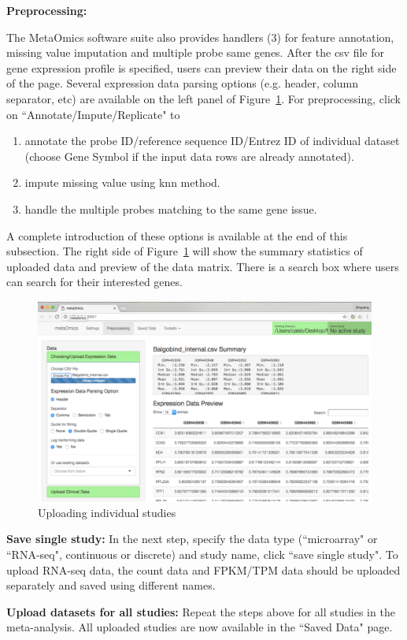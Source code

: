 \begin{steps}
\item \textbf{Preprocessing:}

The MetaOmics software suite also provides handlers {\color{red} (3)} for feature annotation, missing value imputation and multiple probe same genes.
After the csv file for gene expression profile is specified, 
users can preview their data on the right side of the page.
Several expression data parsing options (e.g. header, column separator, etc) are available on the left panel of Figure~\ref{fig:GUIpreview}.
For preprocessing, 
click on ``Annotate/Impute/Replicate" to 
\begin{enumerate}
\item annotate the probe ID/reference sequence ID/Entrez ID of individual dataset (choose Gene Symbol if the input data rows are already annotated).
\item impute missing value using knn method.
\item handle the multiple probes matching to the same gene issue.
\end{enumerate}

A complete introduction of these options is available at the end of this subsection.
The right side of Figure~\ref{fig:GUIpreview} will show the summary statistics of uploaded data and preview of the data matrix.
There is a search box where users can search for their interested genes.

\begin{figure}[H]
\begin{center}
\includegraphics[scale=0.7]{./figure/preprocessing/GUIpreview}
\caption{Uploading individual studies}
\label{fig:GUIpreview}
\end{center}
\end{figure}

\item \textbf{Save single study:}
In the next step,
specify the data type (``microarray" or ``RNA-seq", continuous or discrete) and study name,
click ``save single study".
To upload RNA-seq data, the count data and FPKM/TPM
 data should be uploaded separately and saved using different names.

\item \textbf{Upload datasets for all studies:}
Repeat the steps above for all studies in the meta-analysis.
All uploaded studies are now available in the ``Saved Data" page. 
 
\end{steps}

